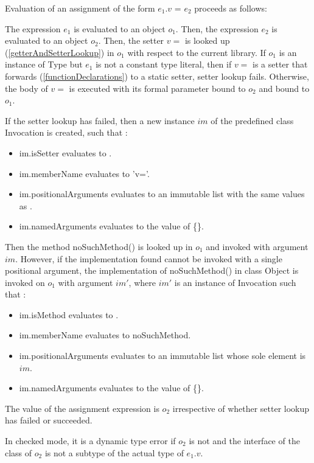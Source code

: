 \documentclass{article}
\newcommand{\code}[1]{{\sf #1}}
\begin{document}
\LMHash{}
Evaluation of an assignment of the form $e_1.v$ \code{=} $e_2$ proceeds as follows:

\LMHash{}
The expression $e_1$ is evaluated to an object $o_1$. Then, the expression $e_2$  is evaluated to an object $o_2$. Then, the setter $v=$ is looked up (\ref{getterAndSetterLookup}) in $o_1$ with respect to the current library.  If $o_1$ is an instance of \code{Type} but $e_1$ is not a constant type literal, then if $v=$ is a setter that forwards (\ref{functionDeclarations}) to a static setter, setter lookup fails. Otherwise, the body  of $v=$ is executed with its formal parameter bound to $o_2$ and \THIS{} bound to $o_1$. 

\LMHash{}
If the setter lookup has failed, then a new instance $im$  of the predefined class  \code{Invocation}  is created, such that :
\begin{itemize}
\item  \code{im.isSetter} evaluates to \code{\TRUE{}}.
\item  \code{im.memberName} evaluates to \code{'v='}.
\item \code{im.positionalArguments} evaluates to an immutable list with the same values as \code{[$o_2$]}.
\item \code{im.namedArguments} evaluates to the value of \code{\CONST{} \{\}}.
\end{itemize}

\LMHash{}
Then the method \code{noSuchMethod()} is looked up in $o_1$ and invoked  with argument $im$. 
However, if the implementation found cannot be invoked with a single positional argument, the implementation  of \code{noSuchMethod()} in class \code{Object} is invoked on $o_1$ with argument $im'$, where $im'$ is an instance of \code{Invocation} such that :
\begin{itemize}
\item  \code{im.isMethod} evaluates to \code{\TRUE{}}.
\item  \code{im.memberName} evaluates to \code{noSuchMethod}.
\item \code{im.positionalArguments} evaluates to an immutable list whose sole element is  $im$.
\item \code{im.namedArguments} evaluates to the value of \code{\CONST{} \{\}}.
\end{itemize}

\LMHash{}
The value of the assignment expression is $o_2$ irrespective of whether setter lookup has failed or succeeded.

\LMHash{}
In checked mode, it is a dynamic type error if $o_2$ is not \NULL{} and the interface of the class of $o_2$ is not a subtype of the actual type of $e_1.v$.
\end{document}
